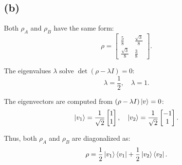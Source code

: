 \documentclass{article}
\begin{document}
\subsection*{(b)}

Both \(\rho_A\) and \(\rho_B\) have the same form:
\[
\rho = \begin{bmatrix}
\frac{5}{8} & \frac{\sqrt{3}}{8} \\
\frac{\sqrt{3}}{8} & \frac{3}{8}
\end{bmatrix}.
\]

The eigenvalues \(\lambda\) solve \(\det(\rho - \lambda I) = 0\):
\[
\lambda = \frac{1}{2}, \quad \lambda = 1.
\]

The eigenvectors are computed from \((\rho - \lambda I)\ket{v} = 0\):
\[
\ket{v_1} = \frac{1}{\sqrt{2}} \begin{bmatrix} 1 \\ 1 \end{bmatrix}, \quad \ket{v_2} = \frac{1}{\sqrt{2}} \begin{bmatrix} -1 \\ 1 \end{bmatrix}.
\]

Thus, both \(\rho_A\) and \(\rho_B\) are diagonalized as:
\[
\rho = \frac{1}{2} \ket{v_1}\bra{v_1} + \frac{1}{2} \ket{v_2}\bra{v_2}.
\]
\end{document}
